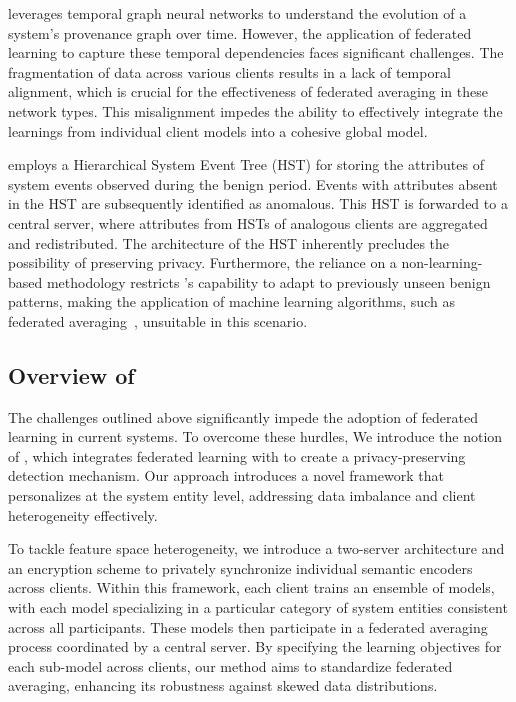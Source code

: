  \kairos leverages temporal graph neural networks to understand the evolution of a system's provenance graph over time. However, the application of federated learning to capture these temporal dependencies faces significant challenges. The fragmentation of data across various clients results in a lack of temporal alignment, which is crucial for the effectiveness of federated averaging in these network types. This misalignment impedes the ability to effectively integrate the learnings from individual client models into a cohesive global model.

 \disdet employs a Hierarchical System Event Tree (HST) for storing the attributes of system events observed during the benign period. Events with attributes absent in the HST are subsequently identified as anomalous. This HST is forwarded to a central server, where attributes from HSTs of analogous clients are aggregated and redistributed. The architecture of the HST inherently precludes the possibility of preserving privacy. Furthermore, the reliance on a non-learning-based methodology restricts \disdet's capability to adapt to previously unseen benign patterns, making the application of machine learning algorithms, such as federated averaging~\cite{mcmahan2017communication}, unsuitable in this scenario.




\subsection{Overview of \Sys}
The challenges outlined above significantly impede the adoption of federated learning in current systems. To overcome these hurdles, We introduce the notion of \fpgl , which integrates federated learning with \grl to create a privacy-preserving detection mechanism. Our approach introduces a novel framework that personalizes \grl at the system entity level, addressing data imbalance and client heterogeneity effectively.

To tackle feature space heterogeneity, we introduce a two-server architecture and an encryption scheme to privately synchronize individual semantic encoders across clients. Within this framework, each client trains an ensemble of \gnnshort models, with each model specializing in a particular category of system entities consistent across all participants. These models then participate in a federated averaging process coordinated by a central server. By specifying the learning objectives for each sub-model across clients, our method aims to standardize federated averaging, enhancing its robustness against skewed data distributions.

